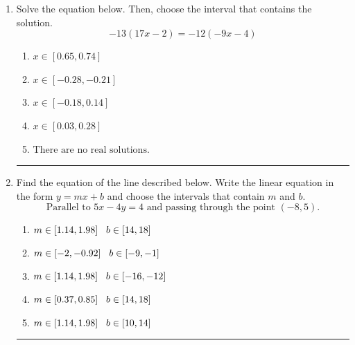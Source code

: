 \documentclass[14pt]{extbook}
\newcommand{\litem}[1]{\item#1\hspace*{-1cm}\rule{\textwidth}{0.4pt}}
\begin{document}
\begin{enumerate}
{\begin{enumerate}[label=\Alph*.]
\end{enumerate} }
\litem{
Solve the equation below. Then, choose the interval that contains the solution.\[ -13(17x -2) = -12(-9x -4) \]\begin{enumerate}[label=\Alph*.]
\item \( x \in [0.65, 0.74] \)
\item \( x \in [-0.28, -0.21] \)
\item \( x \in [-0.18, 0.14] \)
\item \( x \in [0.03, 0.28] \)
\item \( \text{There are no real solutions.} \)

\end{enumerate} }
\litem{
Find the equation of the line described below. Write the linear equation in the form $ y=mx+b $ and choose the intervals that contain $m$ and $b$.\[ \text{Parallel to } 5 x - 4 y = 4 \text{ and passing through the point } (-8, 5). \]\begin{enumerate}[label=\Alph*.]
\item \( m \in [1.14, 1.98] \hspace*{3mm} b \in [14, 18] \)
\item \( m \in [-2, -0.92] \hspace*{3mm} b \in [-9, -1] \)
\item \( m \in [1.14, 1.98] \hspace*{3mm} b \in [-16, -12] \)
\item \( m \in [0.37, 0.85] \hspace*{3mm} b \in [14, 18] \)
\item \( m \in [1.14, 1.98] \hspace*{3mm} b \in [10, 14] \)


\end{enumerate}}
\end{enumerate}
\end{document}
